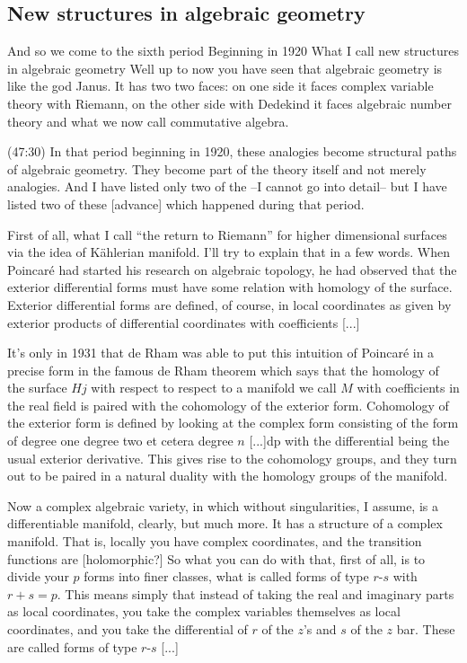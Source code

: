 \documentclass{article}
\begin{document}
\subsection{New structures in algebraic geometry}
And so we come to the sixth period 
Beginning in 1920
What I call new structures in algebraic geometry
Well up to now you have seen 
that algebraic geometry is like the god Janus.
It has two two faces:
on one side it faces complex variable theory with Riemann,
on the other side with Dedekind 
it faces algebraic number theory and 
what we now call commutative algebra.

(47:30)
In that period beginning in 1920,
these analogies become structural paths of algebraic geometry.
They become part of the theory itself and not merely analogies.
And I have listed only two of the --I cannot go into detail--
but I have listed two of these [advance] which happened during that period.

First of all, what I call ``the return to Riemann''
for higher dimensional surfaces
via the idea of K\"ahlerian manifold.
I'll try to explain that in a few words.
When Poincar\'e had started his research on algebraic topology,
he had observed that the exterior differential forms
must have some relation with homology of the surface.
Exterior differential forms are defined, of course,
in local coordinates as given by exterior products of differential coordinates
with coefficients [...]

It's only in 1931 that de Rham was able 
to put this intuition of Poincar\'e 
in a precise form in the famous de Rham theorem
which says that the homology of the surface $Hj$ with 
respect to respect to a manifold we call $M$ 
with coefficients in the real field 
is paired with the cohomology of the exterior form.
Cohomology of the exterior form is defined by looking at the complex form
consisting of the form of degree one degree two et cetera degree $n$
[...]dp
with the differential being the usual exterior derivative.
This gives rise to the cohomology groups,
and they turn out to be paired in a natural duality 
with the homology groups of the manifold.

Now a complex algebraic variety,
in which without singularities, I assume,
is a differentiable manifold, clearly, but much more.
It has a structure of a complex manifold. 
That is, locally you have complex coordinates,
and the transition functions are [holomorphic?]
So what you can do with that, first of all,
is to divide your $p$ forms into finer classes,
what is called forms of type $r$-$s$ with $r+s=p$.
This means simply that instead of taking 
the real and imaginary parts as local coordinates,
you take the complex variables themselves as local coordinates,
and you take the differential of $r$ of the $z$'s and $s$ of the $z$ bar.
These are called forms of type $r$-$s$ [...]
\end{document}
